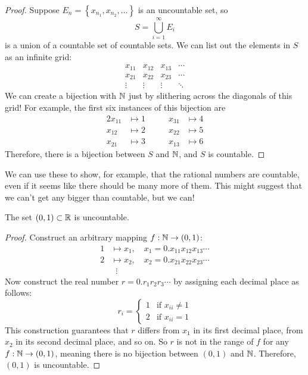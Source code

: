 \documentclass[../m131main.tex]{subfiles}
\begin{document}
\begin{proof}
    Suppose $E_n = \left\{ x_{n_1}, x_{n_2}, \ldots \right\}$ is an uncountable set, so
    \[ S = \bigcup_{i=1}^\infty E_i \]
    is a union of a countable set of countable sets.
    We can list out the elements in $S$ as an infinite grid:
    \[ \begin{matrix}  
        x_{11} & x_{12} & x_{13} & \cdots \\
        x_{21} & x_{22} & x_{23} & \cdots \\
        \vdots & \vdots & \vdots & \ddots
    \end{matrix} \]
    We can create a bijection with $\mathbb{N}$ just by slithering across the diagonals of this grid!
    For example, the first six instances of this bijection are
    \begin{alignat*}{2}
        x_{11} &\mapsto 1 &\qquad x_{31} &\mapsto 4 \\
        x_{12} &\mapsto 2 &\qquad x_{22} &\mapsto 5 \\
        x_{21} &\mapsto 3 &\qquad x_{13} &\mapsto 6
    \end{alignat*}
    Therefore, there is a bijection between $S$ and $\mathbb{N}$, and $S$ is countable.
\end{proof}

We can use these to show, for example, that the rational numbers are countable, even if it seems like there should be many more of them.
This might suggest that we can't get any bigger than countable, but we can!

\begin{theorem}
    The set $(0,1) \subset \mathbb{R}$ is uncountable.
\end{theorem}

\begin{proof}
    Construct an arbitrary mapping $f : \mathbb{N} \to (0,1)$:
    \begin{align*}
        1 &\mapsto x_1, \quad x_1 = 0.x_{11}x_{12}x_{13} \cdots \\
        2 &\mapsto x_2, \quad x_2 = 0.x_{21}x_{22}x_{23} \cdots \\
        &\;\;\vdots
    \end{align*}
    Now construct the real number $r = 0.r_1r_2r_3 \cdots$ by assigning each decimal place as follows:
    \[ r_i = \begin{cases} 1 & \text{if } x_{ii} \neq 1 \\ 2 & \text{if } x_{ii} = 1 \end{cases} \]
    This construction guarantees that $r$ differs from $x_1$ in its first decimal place, from $x_2$ in its second decimal place, and so on.
    So $r$ is not in the range of $f$ for any $f : \mathbb{N} \to (0,1)$, meaning there is no bijection between $(0,1)$ and $\mathbb{N}$.
    Therefore, $(0,1)$ is uncountable.
\end{proof}
\end{document}
